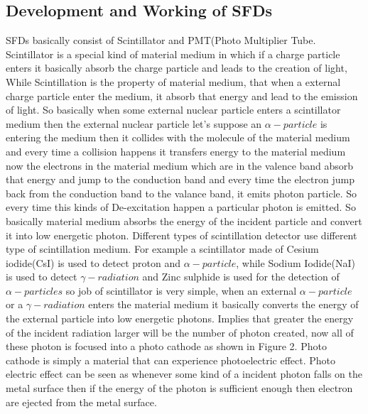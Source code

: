\documentclass{article}
\begin{document}
\begin{multicols}{2}
\subsection{Development and Working of SFDs}
SFDs basically consist of Scintillator and PMT(Photo Multiplier Tube. Scintillator is a special kind of material medium in which if a charge particle enters it basically absorb the charge particle and leads to the creation of light, While Scintillation is the property of material medium, that when a external charge particle enter the medium, it absorb that energy and lead to the emission of light. So basically when some external nuclear particle enters a scintillator medium then the external nuclear particle let's suppose an $\alpha-particle$ is entering the medium then it collides with the molecule of the material medium and every time a collision happens it transfers energy to the material medium now the electrons in the material medium which are in the valence band absorb that energy and jump to the conduction band and every time the electron jump back from the conduction band to the valance band, it emits photon particle. So every time this kinds of De-excitation happen a particular photon is emitted. So basically material medium  absorbs the energy of the incident particle and convert it into low energetic photon. Different types of scintillation detector use different type of scintillation medium. For example  a scintillator made of Cesium iodide(CsI) is used to detect proton and $\alpha-particle$, while Sodium Iodide(NaI) is used to detect $\gamma-radiation$ and Zinc sulphide is used for the detection of $\alpha-particles$ so job of scintillator is very simple, when an external $\alpha-particle$ or a $\gamma-radiation$ enters the material medium it basically converts the energy of the external particle into low energetic photons. Implies that greater the energy of the incident radiation larger will be the number of photon created, now all of these photon is focused into a photo cathode as shown in Figure 2. Photo cathode is simply a material that can experience photoelectric effect. Photo electric effect can be seen as whenever some kind of a incident photon falls on the metal surface then if the energy of the photon is sufficient enough then electron are ejected from the metal surface. 

\end{multicols}






 
\end{document}

